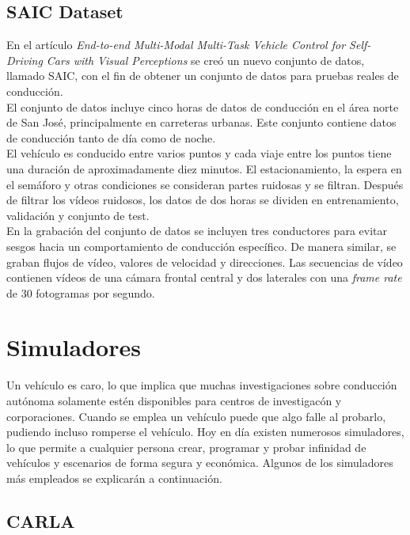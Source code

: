 \subsection{SAIC Dataset}

En el artículo \textit{End-to-end Multi-Modal Multi-Task Vehicle Control for Self-Driving Cars with Visual Perceptions} \cite{multi-modal} se creó un nuevo conjunto de datos, llamado SAIC, con el fin de obtener un conjunto de datos para pruebas reales de conducción.\\

El conjunto de datos incluye cinco horas de datos de conducción en el área norte de San José, principalmente en carreteras urbanas. Este conjunto contiene datos de conducción tanto de día como de noche. \\

El vehículo es conducido entre varios puntos y cada viaje entre los puntos tiene una duración de aproximadamente diez minutos. El estacionamiento, la espera en el semáforo y otras condiciones se consideran partes ruidosas y se filtran. Después de filtrar los vídeos ruidosos, los datos de dos horas se dividen en entrenamiento, validación y conjunto de test.\\

En la grabación del conjunto de datos se incluyen tres conductores para evitar sesgos hacia un comportamiento de conducción específico. De manera similar, se graban flujos de vídeo, valores de velocidad y direcciones. Las secuencias de vídeo contienen vídeos de una cámara frontal central y dos laterales con una \textit{frame rate} de 30 fotogramas por segundo.



\section{Simuladores}

Un vehículo es caro, lo que implica que muchas investigaciones sobre conducción autónoma solamente estén disponibles para centros de investigacón y corporaciones. Cuando se emplea un vehículo puede que algo falle al probarlo, pudiendo incluso romperse el vehículo. Hoy en día existen numerosos simuladores, lo que permite a cualquier persona crear, programar y probar infinidad de vehículos y escenarios de forma segura y económica. Algunos de los simuladores más empleados se explicarán a continuación.

\subsection{CARLA}


